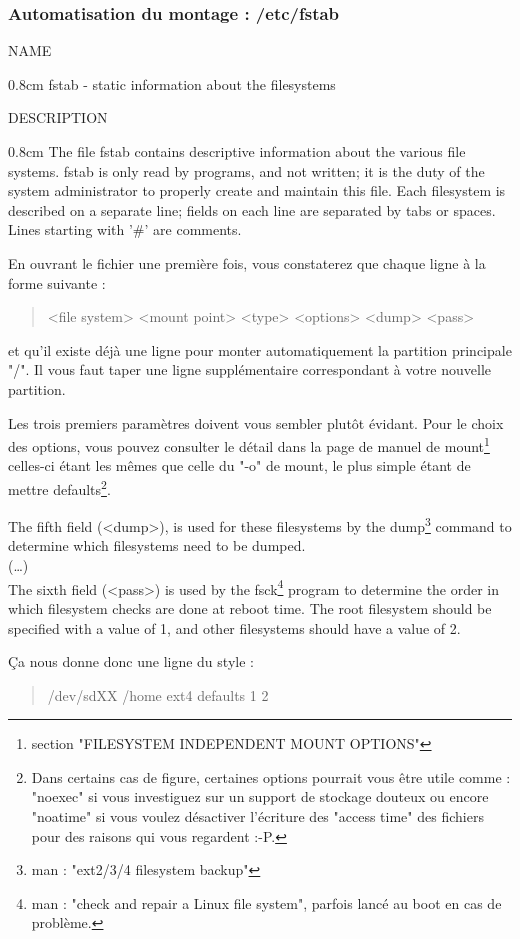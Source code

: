\documentclass[a4paper,11pt]{article}
\newcommand{\commande}[1] {
    \begin{quote}
    \tt\raggedright #1 
    \end{quote}
}
\newcommand{\man}[2]{
    \begin{tcolorbox}[toprule=3mm,width=\textwidth,outer arc=0mm,colbacktitle=grayman,coltitle=black,colback={grayman},colframe={grayman},title={man : \tt #1}]
        \tt\raggedright #2
    \end{tcolorbox}
}
\newcommand{\mandesc}[1]{
    \begin{adjustwidth}{0.8cm}{}
        #1
    \end{adjustwidth}
}
\begin{document}
\subsubsection{Automatisation du montage : /etc/fstab}
\man{fstab}{NAME
\mandesc{fstab - static information about the filesystems}
DESCRIPTION
\mandesc{The  file  fstab  contains descriptive information about the various file systems.  fstab is only read by programs, and not written; it is the duty of the system administrator to properly create and maintain this file.  Each filesystem is described on a separate line; fields on each line are separated by tabs or spaces.  Lines starting with '\#' are comments. }}
\par En ouvrant le fichier une première fois, vous constaterez que chaque ligne à la forme suivante :
\commande{<file system> <mount point> <type> <options> <dump> <pass>}
et qu'il existe déjà une ligne pour monter automatiquement la partition principale "/". Il vous faut taper une ligne supplémentaire correspondant à votre nouvelle partition.
\par Les trois premiers paramètres doivent vous sembler plutôt évidant. Pour le choix des options, vous pouvez consulter le détail dans la page de manuel de mount\footnote{section "FILESYSTEM INDEPENDENT MOUNT OPTIONS"} celles-ci étant les mêmes que celle du "-o" de mount, le plus simple étant de mettre defaults\footnote{Dans certains cas de figure, certaines options pourrait vous être utile comme : "noexec" si vous investiguez sur un support de stockage douteux ou encore "noatime" si vous voulez désactiver l'écriture des "access time" des fichiers pour des raisons qui vous regardent :-P.}.
\man{fstab}{
The fifth field (<dump>), is used for these filesystems by the dump\footnote{man : "ext2/3/4 filesystem backup"} command to determine which filesystems need to be dumped.\\
(\dots)\\
The sixth field (<pass>) is used by the fsck\footnote{man : "check and repair a Linux file system", parfois lancé au boot en cas de problème.} program to determine the order in which filesystem checks are done at reboot time. The root filesystem should be specified with a value of 1, and other filesystems should have a value of 2.
}
\par Ça nous donne donc une ligne du style :
\commande{/dev/sdXX /home ext4 defaults 1 2}
\end{document}
